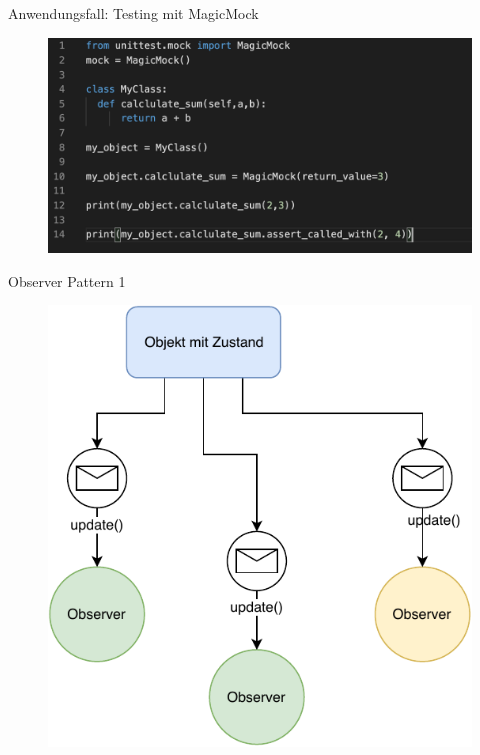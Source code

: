 \begin{frame}{Anwendungsfall: Testing mit MagicMock}
   \begin{figure}[!htb]
        \includegraphics[scale=0.47]{img/magicmock}
    \end{figure}

\end{frame}

\begin{frame}{Observer Pattern 1}
       \begin{figure}[!htb]
        \includegraphics[scale=0.67]{img/observer}
    \end{figure}

\end{frame}

